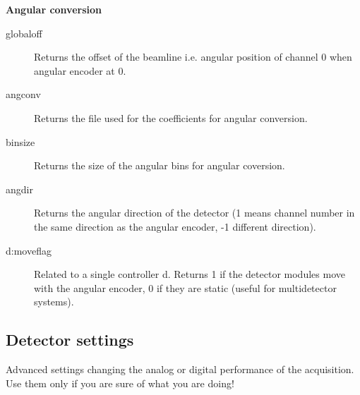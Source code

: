 \documentclass{article}
\begin{document}
\textbf{Angular conversion}

\begin{description}
\item[globaloff]   Returns the  offset  of the beamline i.e. angular position of channel 0 when angular encoder at 0. 
\item[angconv] Returns the file used for the coefficients for angular conversion.
\item[binsize] Returns the size of the angular bins for angular coversion. 
\item[angdir] Returns the angular direction of the detector (1 means channel number in the same direction as the angular encoder, -1 different direction). 
\item[d:moveflag]  Related to a single controller d. Returns 1 if the detector modules move with the angular encoder, 0 if they are static (useful for multidetector systems).
\end{description}



\subsection{Detector settings}
Advanced settings changing the analog or digital performance of the acquisition. Use them only if you are sure of what you are doing!
\end{document}
